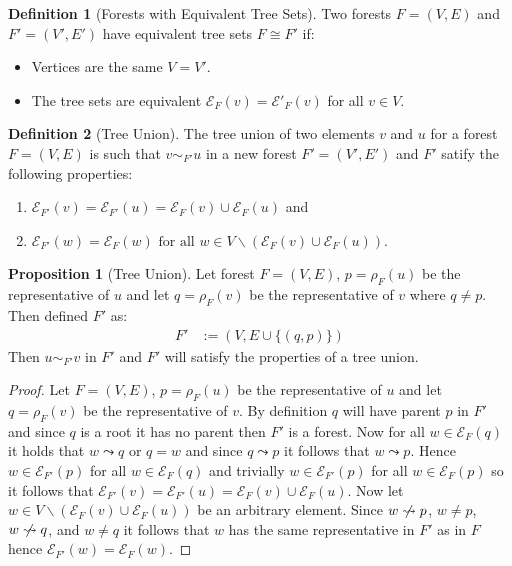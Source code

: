 \documentclass[a4paper,12pt]{article}
\theoremstyle{definition}
\newtheorem{definition}{Definition}[section]
\newtheorem{proposition}{Proposition}[section]
\begin{document}
\begin{definition}[Forests with Equivalent Tree Sets]
    Two forests $F = (V, E)$ and $F' = (V', E')$ have equivalent tree sets $F
    \cong F'$ if:
    \begin{itemize}
        \item Vertices are the same $V = V'$.
        \item The tree sets are equivalent $\mathcal{E}_{F}(v) =
        \mathcal{E'}_F(v)$ for all $v \in V$.
    \end{itemize}
\end{definition}

\begin{definition}[Tree Union]
    The tree union of two elements $v$ and $u$ for a forest $F = (V, E)$ is such
    that $v \sim_{F'} u$ in a new forest $F' = (V', E')$ and $F'$ satify the
    following properties:
    \begin{enumerate}
        \item $\mathcal{E}_{F'}(v) = \mathcal{E}_{F'}(u) = \mathcal{E}_F(v) \cup \mathcal{E}_F(u)$ and
        \item $\mathcal{E}_{F'}(w) = \mathcal{E}_F(w) \text{ for all } w \in V
        \backslash (\mathcal{E}_F(v) \cup \mathcal{E}_F(u))$.
    \end{enumerate}
\end{definition}

\begin{proposition}[Tree Union]\label{def:tree-union}
    Let forest $F = (V, E)$, $p = \rho_F(u)$ be the representative of $u$ and
    let $q = \rho_F(v)$ be the representative of $v$ where $q \neq p$. Then
    defined $F'$ as:
    \begin{align*}
        F' &:= (V, E \cup \{(q, p)\})
    \end{align*}
    Then $u \sim_{F'} v$ in $F'$ and $F'$ will satisfy the properties of a tree
    union.
\end{proposition}

\begin{proof}
    Let $F = (V, E)$, $p = \rho_F(u)$ be the representative of $u$ and let $q =
    \rho_F(v)$ be the representative of $v$. By definition $q$ will have parent
    $p$ in $F'$ and since $q$ is a root it has no parent then $F'$ is a forest.
    Now for all $w \in \mathcal{E}_F(q)$ it holds that $w \leadsto q$ or $q = w$
    and since $q \leadsto p$ it follows that $w \leadsto p$. Hence $w \in
    \mathcal{E}_{F'}(p)$ for all $w \in \mathcal{E}_F(q)$ and trivially $w \in
    \mathcal{E}_{F'}(p)$ for all $w \in \mathcal{E}_F(p)$ so it follows that
    $\mathcal{E}_{F'}(v) = \mathcal{E}_{F'}(u) = \mathcal{E}_F(v) \cup
    \mathcal{E}_F(u)$. Now let $w \in V \backslash (\mathcal{E}_F(v) \cup
    \mathcal{E}_F(u))$ be an arbitrary element. Since $w \centernot\leadsto p$,
    $w \neq p$, $w \centernot\leadsto q$, and $w \neq q$ it follows that $w$ has
    the same representative in $F'$ as in $F$ hence $\mathcal{E}_{F'}(w) =
    \mathcal{E}_F(w)$.
\end{proof}
\end{document}
